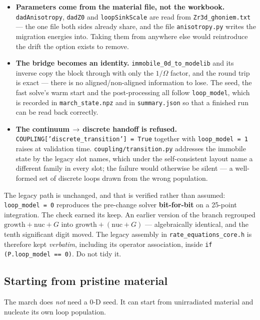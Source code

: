 \documentclass[11pt]{article}
\newcommand{\code}[1]{\texttt{\small #1}}
\newcommand{\file}[1]{\texttt{\footnotesize #1}}
\begin{document}
\begin{itemize}
\item \textbf{Parameters come from the material file, not the workbook.}
      \code{dad\-Anisotropy}, \code{dadZ0} and \code{loopSinkScale} are read
      from \file{Zr3d\_ghoniem.txt} --- the one file both sides already share,
      and the file \code{anisotropy.py} writes the migration energies into.
      Taking them from anywhere else would reintroduce the drift the option
      exists to remove.
\item \textbf{The bridge becomes an identity.} \code{immobile\_0d\_to\_modelib}
      and its inverse copy the block through with only the $1/\Omega$ factor,
      and the round trip is exact --- there is no aligned/non-aligned
      information to lose. The seed, the fast solve's warm start and the
      post-processing all follow \code{loop\_model}, which is recorded in
      \file{march\_state.npz} and in \code{summary.json} so that a finished run
      can be read back correctly.
\item \textbf{The continuum$\,\to\,$discrete handoff is refused.}
      \code{COUPLING['discrete\_transition'] = True} together with
      \code{loop\_model = 1} raises at validation time.
      \file{coupling/transition.py} addresses the immobile state by the legacy
      slot names, which under the self-consistent layout name a different
      family in every slot; the failure would otherwise be silent --- a
      well-formed set of discrete loops drawn from the wrong population.
\end{itemize}

\noindent The legacy path is unchanged, and that is verified rather than
assumed: \code{loop\_model = 0} reproduces the pre-change solver
\textbf{bit-for-bit} on a 25-point integration. The check earned its keep. An
earlier version of the branch regrouped $\text{growth} + \text{nuc} + G$ into
$\text{growth} + (\text{nuc} + G)$ --- algebraically identical, and the tenth
significant digit moved. The legacy assembly in
\file{rate\_equations\_core.h} is therefore kept \emph{verbatim}, including its
operator association, inside \code{if (P.loop\_model == 0)}. Do not tidy it.

\subsection{Starting from pristine material}
\label{sec:pristine-manual}

The march does \emph{not} need a 0-D seed. It can start from unirradiated
material and nucleate its own loop population.
\end{document}

